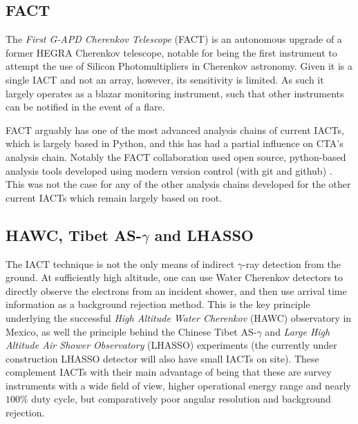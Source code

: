 \subsection{FACT}
The \textit{First G-APD Cherenkov Telescope} (FACT) is an autonomous upgrade of a former HEGRA Cherenkov telescope, notable for being the first instrument to attempt the use of Silicon Photomultipliers in Cherenkov astronomy. Given it is a single IACT and not an array, however, its sensitivity is limited. As such it largely operates as a blazar monitoring instrument, such that other instruments can be notified in the event of a flare. 

FACT arguably has one of the most advanced analysis chains of current IACTs, which is largely based in Python, and this has had a partial influence on CTA's analysis chain. Notably the FACT collaboration used open source, python-based analysis tools developed using modern version control (with git and github) \cite{factspec}. This was not the case for any of the other analysis chains developed for the other current IACTs which remain largely based on root.

\subsection{HAWC, Tibet AS-$\gamma$ and LHASSO}

The IACT technique is not the only means of indirect $\gamma$-ray detection from the ground. At sufficiently high altitude, one can use Water Cherenkov detectors to directly observe the electrons from an incident shower, and then use arrival time information as a background rejection method. This is the key principle underlying the successful \textit{High Altitude Water Cherenkov} (HAWC) observatory in Mexico, as well the principle behind the Chinese Tibet AS-$\gamma$ and \textit{Large High Altitude Air Shower Observatory} (LHASSO) experiments (the currently under construction LHASSO detector will also have small IACTs on site). These complement IACTs with their main advantage of being that these are survey instruments with a wide field of view, higher operational energy range and nearly $100\%$ duty cycle, but comparatively poor angular resolution and background rejection. 

